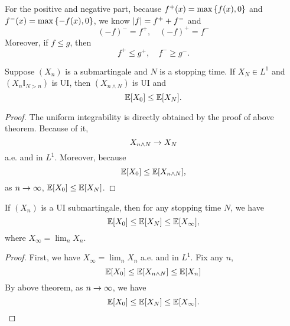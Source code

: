 \begin{rmk}
    For the positive and negative part, because $f^+(x) = \max \left\{f(x),0\right\}$ and $f^-(x) = \max \left\{-f(x),0\right\}$, we know $\left\lvert f\right\lvert = f^+ + f^-$ and
    \begin{equation*}
        (-f)^- = f^+,\quad (-f)^+ = f^-
    \end{equation*}
    Moreover, if $f \leq g$, then
    \begin{equation*}
        f^+ \leq g^+,\quad f^- \geq g^-.
    \end{equation*}
\end{rmk}

\begin{thm}
    Suppose $(X_n)$ is a submartingale and $N$ is a stopping time. If $X_N \in L^1$ and $(X_n\mathbb{I}_{N > n})$ is UI, then $(X_{n \wedge N})$ is UI and
    \begin{equation*}
        \mathbb{E}[X_0] \leq \mathbb{E}[X_N].
    \end{equation*}
\end{thm}
\begin{proof}
    The uniform integrability is directly obtained by the proof of above theorem. Because of it,
    \begin{equation*}
        X_{n \wedge N} \rightarrow X_N
    \end{equation*}
    a.e. and in $L^1$. Moreover, because
    \begin{equation*}
        \mathbb{E}[X_0] \leq \mathbb{E}[X_{n \wedge N}],
    \end{equation*}
    as $n \rightarrow \infty$, $\mathbb{E}[X_0] \leq \mathbb{E}[X_N]$. \qedhere
\end{proof}

\begin{thm}
    If $(X_n)$ is a UI submartingale, then for any stopping time $N$, we have
    \begin{equation*}
        \mathbb{E}[X_0] \leq \mathbb{E}[X_N] \leq \mathbb{E}[X_\infty],
    \end{equation*}
    where $X_\infty = \lim_n X_n$.
\end{thm}
\begin{proof}
    First, we have $X_\infty = \lim_n X_n$ a.e. and in $L^1$. Fix any $n$,
    \begin{equation*}
        \mathbb{E}[X_0] \leq \mathbb{E}[X_{n \wedge N}] \leq \mathbb{E}[X_n]
    \end{equation*}
    By above theorem, as $n \rightarrow \infty$, we have
    \begin{equation*}
        \mathbb{E}[X_0] \leq \mathbb{E}[X_N] \leq \mathbb{E}[X_\infty]. \qedhere
    \end{equation*}
\end{proof}

